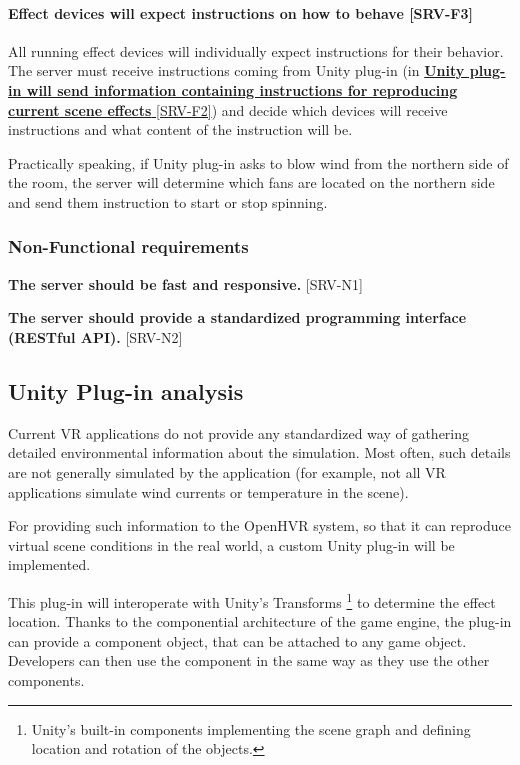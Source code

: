 \hypertarget{x-\textbf{effect-devices-will-expect-instructions-on-how-to-behave}-[srv-f3]}{\paragraph*{\textbf{Effect devices will expect instructions on how to behave} [SRV-F3]}}
All running effect devices will individually expect instructions for their
behavior. The server must receive instructions coming from Unity plug-in (in \hyperlink{srv-f2}{\textbf{Unity plug-in will send information containing instructions for reproducing current scene effects} [SRV-F2]})
and decide which devices will receive instructions and what content of the
instruction will be.


Practically speaking, if Unity plug-in asks to blow wind from the northern side of
the room, the server will determine which fans are located on the northern side
and send them instruction to start or stop spinning.


\hypertarget{x-non-functional-requirements}{\subsubsection*{Non-Functional requirements}}
\textbf{The server should be fast and responsive.} [SRV-N1]


\textbf{The server should provide a standardized programming interface (RESTful API).} [SRV-N2]


\hypertarget{x-unity-plug-in-analysis}{\subsection*{Unity Plug-in analysis}}
Current VR applications do not provide any standardized way
of gathering detailed environmental information about the simulation.
Most often, such details are not generally simulated by the application
(for example, not all VR applications simulate wind currents or
temperature in the scene).


For providing such information to the OpenHVR system, so that it can
reproduce virtual scene conditions in the real world, a custom Unity plug-in
will be implemented.


This plug-in will interoperate with Unity’s Transforms
\footnote{Unity’s built-in components implementing the scene graph and defining location and rotation of the objects.}
to determine the effect location. Thanks to the
componential architecture of the game engine, the plug-in can provide
a component object, that can be attached to any game object.
Developers can then use the component in the same way as they use the other
components.


